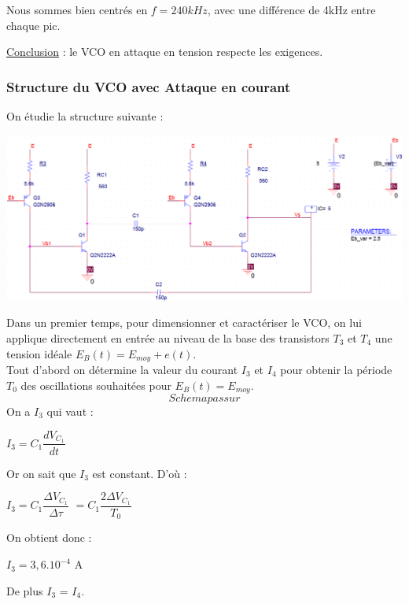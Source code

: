 \documentclass[a4paper]{report}
\begin{document}
Nous sommes bien centrés en $f = 240 kHz$, avec une différence de 4kHz entre chaque pic.

\underline{Conclusion} : le VCO en attaque en tension respecte les exigences.
\newpage
\subsubsection{Structure du VCO avec Attaque en courant}

On étudie la structure suivante :

\begin{center}
\includegraphics[width=1\textwidth]{VCOI.PNG}
\end{center}


Dans un premier temps, pour dimensionner et caractériser le VCO, on lui applique directement en entrée au niveau de la base des transistors $T_3$ et $T_4$ une tension idéale $E_B(t) = E_{moy} + e(t)$.\\
Tout d'abord on détermine la valeur du courant $I_3$ et $I_4$ pour obtenir la période $T_0$ des oscillations souhaitées pour $E_B(t) = E_{moy}$.\\
$$Schemapassur$$
On a $I_3$ qui vaut : \\
\begin{center}
$I_3 = C_1 \dfrac{dV_{C_1}}{dt} $\\
\end{center}
Or on sait que $I_3$ est constant. 
D'où :
\begin{center}
 $I_3 = C_1 \dfrac{\Delta V_{C_1}}{\Delta \tau} $
$ = C_1 \dfrac{2\Delta V_{C_1}}{T_0} $
\end{center}
On obtient donc : \\
\begin{center}
$I_3 = 3,6.10^{-4} $ A
\end{center}
De plus $I_3$ = $I_4$.\\
\end{document}
